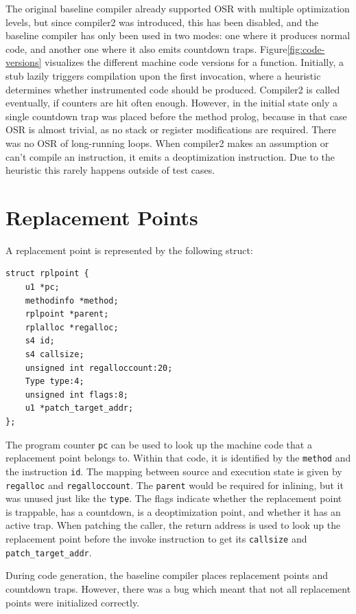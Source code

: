 \documentclass[draft,final]{vutinfth} %
\begin{document}
    The original baseline compiler already supported OSR with multiple optimization levels,
    but since compiler2 was introduced,
    this has been disabled,
    and the baseline compiler has only been used in two modes:
    one where it produces normal code,
    and another one where it also emits countdown traps.
    Figure\ref{fig:code-versions} visualizes the different machine code versions for a function.
    Initially, a stub lazily triggers compilation upon the first invocation,
    where a heuristic determines whether instrumented code should be produced.
    Compiler2 is called eventually,
    if counters are hit often enough.
    However, in the initial state only a single countdown trap was placed before the method prolog,
    because in that case OSR is almost trivial,
    as no stack or register modifications are required.
    There was no OSR of long-running loops.
    When compiler2 makes an assumption or can't compile an instruction, it emits a deoptimization instruction.
    Due to the heuristic this rarely happens outside of test cases.


    \section{Replacement Points}

    A replacement point is represented by the following struct:
    \begin{lstlisting}
struct rplpoint {
    u1 *pc;
    methodinfo *method;
    rplpoint *parent;
    rplalloc *regalloc;
    s4 id;
    s4 callsize;
    unsigned int regalloccount:20;
    Type type:4;
    unsigned int flags:8;
    u1 *patch_target_addr;
};
    \end{lstlisting}
    The program counter \lstinline{pc} can be used to look up the machine code that a replacement point belongs to.
    Within that code, it is identified by the \lstinline{method} and the instruction \lstinline{id}.
    The mapping between source and execution state is given by \lstinline{regalloc} and \lstinline{regalloccount}.
    The \lstinline{parent} would be required for inlining, but it was unused just like the \lstinline{type}.
    The flags indicate whether the replacement point is trappable, has a countdown, is a deoptimization point, and whether it has an active trap.
    When patching the caller, the return address is used to look up the replacement point before the invoke instruction
    to get its \lstinline{callsize} and \lstinline{patch_target_addr}.

    During code generation, the baseline compiler places replacement points and countdown traps.
    However, there was a bug which meant that not all replacement points were initialized correctly.
\end{document}
